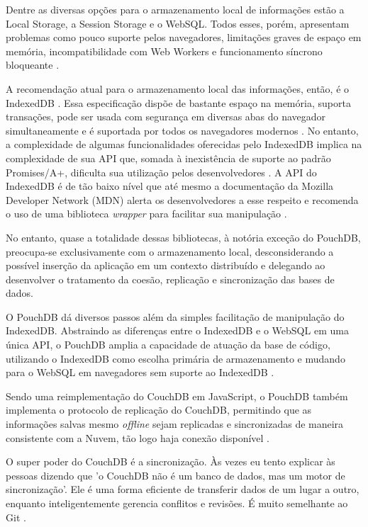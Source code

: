 \documentclass[
	article,			%
	11pt,				%
	oneside,			%
	a4paper,			%
	english,			%
	brazil,				%
	sumario=tradicional
	]{abntex2}
\begin{document}
Dentre as diversas opções para o armazenamento local de informações estão a Local Storage, a Session Storage e o WebSQL. Todos esses, porém, apresentam problemas como pouco suporte pelos navegadores, limitações graves de espaço em memória, incompatibilidade com Web Workers e funcionamento síncrono bloqueante \cite{osmani-cohen-2017}.

A recomendação atual para o armazenamento local das informações, então, é o IndexedDB \cite{osmani-cohen-2017}. Essa especificação dispõe de bastante espaço na memória, suporta transações, pode ser usada com segurança em diversas abas do navegador simultaneamente e é suportada por todos os navegadores modernos \cite{tabalin-2017}. No entanto, a complexidade de algumas funcionalidades oferecidas pelo IndexedDB implica na complexidade de sua API que, somada à inexistência de suporte ao padrão Promises/A+, dificulta sua utilização pelos desenvolvedores \cite{osmani-2016}. A API do IndexedDB é de tão baixo nível que até mesmo a documentação da Mozilla Developer Network (MDN) alerta os desenvolvedores a esse respeito e recomenda o uso de uma biblioteca \textit{wrapper} para facilitar sua manipulação \cite{smith-2016}.

No entanto, quase a totalidade dessas bibliotecas, à notória exceção do PouchDB, preocupa-se exclusivamente com o armazenamento local, desconsiderando a possível inserção da aplicação em um contexto distribuído e delegando ao desenvolver o tratamento da coesão, replicação e sincronização das bases de dados.

O PouchDB dá diversos passos além da simples facilitação de manipulação do IndexedDB. Abstraindo as diferenças entre o IndexedDB e o WebSQL em uma única API, o PouchDB amplia a capacidade de atuação da base de código, utilizando o IndexedDB como escolha primária de armazenamento e mudando para o WebSQL em navegadores sem suporte ao IndexedDB \cite{brown-2014}.

Sendo uma reimplementação do CouchDB em JavaScript, o PouchDB também implementa o protocolo de replicação do CouchDB, permitindo que as informações salvas mesmo \textit{offline} sejam replicadas e sincronizadas de maneira consistente com a Nuvem, tão logo haja conexão disponível \cite{pouchdb-2017}.

\begin{citacao}
	O super poder do CouchDB é a sincronização. Às vezes eu tento explicar às pessoas dizendo que 'o CouchDB não é um banco de dados, mas um motor de sincronização'. Ele é uma forma eficiente de transferir dados de um lugar a outro, enquanto inteligentemente gerencia conflitos e revisões. É muito semelhante ao Git \cite[tradução nossa]{lawson-2017}.
\end{citacao}
\end{document}
